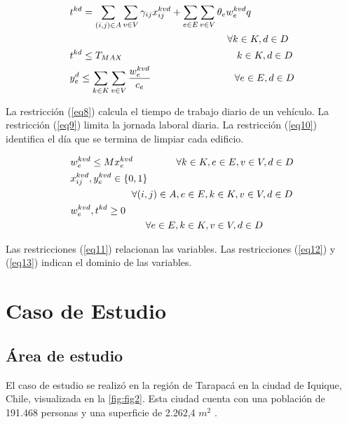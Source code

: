 \documentclass[letterpaper,conference]{IEEEtran}
\begin{document}
{\small
\begin{align}
	& t^{kd} = \sum_{(i,j) \in A} \sum_{v \in V} \gamma_{ij} x_{ij}^{kvd} + \sum_{e \in E} \sum_{v \in V} \theta_{e} {w_{e}^{kvd}}{q} \label{eq8} \\ \nonumber
	& \hspace{5.65cm} \forall k \in K, d \in D \\
	& t^{kd} \leq T_{MAX} \hspace{4.1cm} k \in K, d \in D \label{eq9} \\
	& y_{e}^{d} \leq \sum_{k \in K} \sum_{v \in V} \frac{w_{e}^{kvd}}{c_e} \hspace{3cm} \forall e \in E, d \in D \label{eq10}
\end{align}
}

La restricción (\ref{eq8}) calcula el tiempo de trabajo diario de un vehículo. La restricción (\ref{eq9}) limita la jornada laboral diaria. La restricción (\ref{eq10}) identifica el día que se termina de limpiar cada edificio.

{\small
\begin{align}
	& w_{e}^{kvd} \leq M x_{e}^{kvd} \hspace{1.55cm} \forall k \in K, e \in E, v \in V, d \in D \label{eq11} \\
	& x_{ij}^{kvd}, y_{e}^{kvd} \in \{0,1 \} \label{eq12} \\ \nonumber
	& \hspace{2.2cm} \forall (i,j) \in A, e \in E, k \in K, v \in V, d \in D \\
	& w_{e}^{kvd}, t^{kd} \geq 0 \label{eq13} \\ \nonumber
	& \hspace{2.7cm} \forall e \in E, k \in K, v \in V, d \in D
\end{align}
}

Las restricciones (\ref{eq11}) relacionan las variables. Las restricciones (\ref{eq12}) y (\ref{eq13}) indican el dominio de las variables.

\section{Caso de Estudio}

\subsection{Área de estudio}

El caso de estudio se realizó en la región de Tarapacá en la ciudad de Iquique, Chile, visualizada en la \ref{fig:fig2}. Esta ciudad cuenta con una población de 191.468 personas y una superficie de 2.262,4 $m^{2}$ \citep{CENSO2017}.
\end{document}
